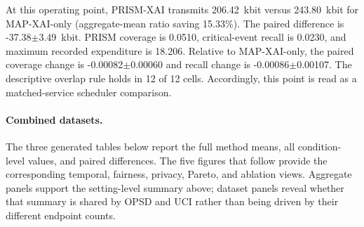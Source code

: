 At this operating point, PRISM-XAI transmits 206.42~kbit versus 243.80~kbit for MAP-XAI-only (aggregate-mean ratio saving 15.33\%). The paired difference is -37.38$\pm$3.49~kbit. PRISM coverage is 0.0510, critical-event recall is 0.0230, and maximum recorded expenditure is 18.206. Relative to MAP-XAI-only, the paired coverage change is -0.00082$\pm$0.00060 and recall change is -0.00086$\pm$0.00107. The descriptive overlap rule holds in 12 of 12 cells. Accordingly, this point is read as a matched-service scheduler comparison.

\paragraph{Combined datasets.} The three generated tables below report the full method means, all condition-level values, and paired differences. The five figures that follow provide the corresponding temporal, fairness, privacy, Pareto, and ablation views. Aggregate panels support the setting-level summary above; dataset panels reveal whether that summary is shared by OPSD and UCI rather than being driven by their different endpoint counts.

\begin{table}[p]\centering\tiny

\caption{Public-score threshold $\tau=1$, release cap $M=8$, Combined datasets: complete generated method table.}

\label{tab:thr_1_cap_8:combined:main}

\resizebox{\linewidth}{!}{}

\end{table}\clearpage

\begin{table}[p]\centering\tiny

\caption{Public-score threshold $\tau=1$, release cap $M=8$, Combined datasets: complete condition-level generated table.}

\label{tab:thr_1_cap_8:combined:conditions}

\resizebox{\textwidth}{!}{}

\end{table}\clearpage

\begin{table}[p]\centering\tiny

\caption{Public-score threshold $\tau=1$, release cap $M=8$, Combined datasets: complete generated paired comparisons.}

\label{tab:thr_1_cap_8:combined:paired}

\resizebox{\textwidth}{!}{}

\end{table}\clearpage

